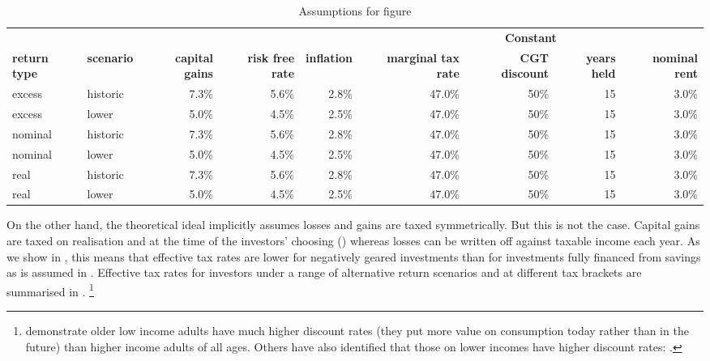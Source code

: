 \documentclass{grattanAlpha}\usepackage[]{graphicx}\usepackage[]{color}
\begin{document}
\begin{table}
\centering
\captionsetup{justification=centering}
\caption{Assumptions for figure }\label{tbl:EMTR-savings-assumptions}
\small
\begin{tabular}{llrrrrrrr}
  \toprule
   &  &  &  &  & \multicolumn{4}{c}{\textbf{Constant}}\\
 \cmidrule(lr){6-9}
 \textbf{return type} & \textbf{scenario} & \textbf{capital gains} & \textbf{risk free rate} & \textbf{inflation} & \textbf{marginal tax rate} & \textbf{CGT discount} & \textbf{years held} & \textbf{nominal rent}\\
 \midrule
excess & historic & 7.3\% & 5.6\% & 2.8\% & 47.0\% & 50\% & 15 & 3.0\% \\ 
  excess & lower & 5.0\% & 4.5\% & 2.5\% & 47.0\% & 50\% & 15 & 3.0\% \\[4pt] 
  nominal & historic & 7.3\% & 5.6\% & 2.8\% & 47.0\% & 50\% & 15 & 3.0\% \\ 
  nominal & lower & 5.0\% & 4.5\% & 2.5\% & 47.0\% & 50\% & 15 & 3.0\% \\[4pt] 
  real & historic & 7.3\% & 5.6\% & 2.8\% & 47.0\% & 50\% & 15 & 3.0\% \\ 
  real & lower & 5.0\% & 4.5\% & 2.5\% & 47.0\% & 50\% & 15 & 3.0\% \\ 
   \bottomrule
\end{tabular}

\end{table}
On the other hand, the theoretical ideal implicitly assumes losses and gains are taxed symmetrically. But this is not the case. Capital gains are taxed on realisation and at the time of the investors’ choosing () whereas losses can be written off against taxable income each year. As we show in , this means that effective tax rates are lower for negatively geared investments than for investments fully financed from savings as is assumed in . Effective tax rates for investors under a range of alternative return scenarios and at different tax brackets are summarised in .%
\footnote{\textcite{GreenMyersonLichtmanEtAl1996} demonstrate older low income adults have much higher discount rates (\ie they put more value on consumption today rather than in the future) than higher income adults of all ages. Others have also identified that those on lower incomes have higher discount rates:  \textcites{ReimersMaylorStewartEtAl2009}{HarrisonLauWilliams2002}.}
\end{document}
